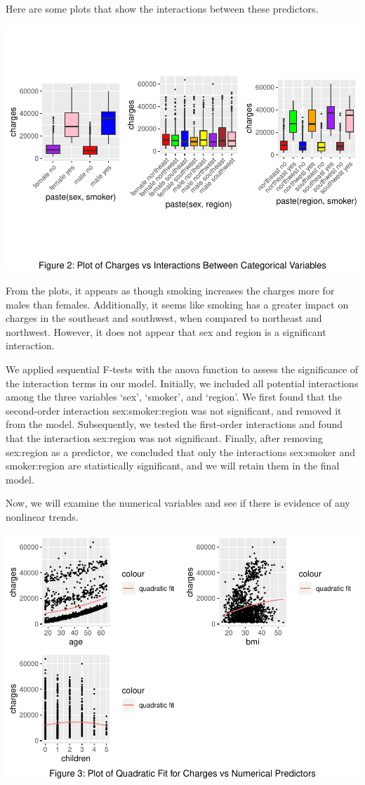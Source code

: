 \documentclass[
  12pt,
]{article}
\begin{document}
Here are some plots that show the interactions between these predictors.

\includegraphics{finalproject_files/figure-latex/unnamed-chunk-11-1.pdf}

From the plots, it appears as though smoking increases the charges more
for males than females. Additionally, it seems like smoking has a
greater impact on charges in the southeast and southwest, when compared
to northeast and northwest. However, it does not appear that sex and
region is a significant interaction.

We applied sequential F-tests with the anova function to assess the
significance of the interaction terms in our model. Initially, we
included all potential interactions among the three variables `sex',
`smoker', and `region'. We first found that the second-order interaction
sex:smoker:region was not significant, and removed it from the model.
Subsequently, we tested the first-order interactions and found that the
interaction sex:region was not significant. Finally, after removing
sex:region as a predictor, we concluded that only the interactions
sex:smoker and smoker:region are statistically significant, and we will
retain them in the final model.

Now, we will examine the numerical variables and see if there is
evidence of any nonlinear trends.

\includegraphics{finalproject_files/figure-latex/unnamed-chunk-16-1.pdf}
\end{document}
